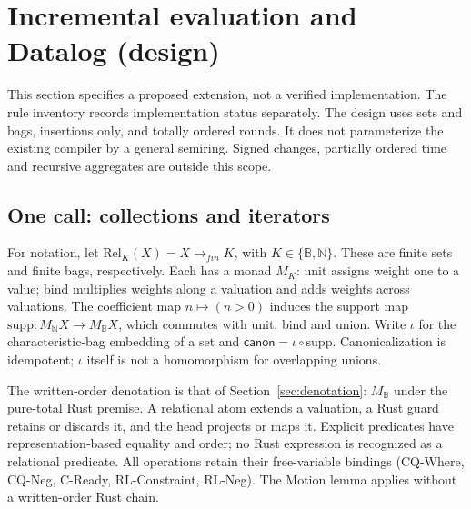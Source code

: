 \section{Incremental evaluation and Datalog (design)}
\label{sec:incremental}
This section specifies a proposed extension, not a verified implementation.
The rule inventory records implementation status separately. The design uses
sets and bags, insertions only, and totally ordered rounds. It does not
parameterize the existing compiler by a general semiring. Signed changes,
partially ordered time and recursive aggregates are outside this scope.

\subsection{One call: collections and iterators}
For notation, let $\mathrm{Rel}_K(X)=X\to_{fin}K$, with
$K\in\{\mathbb B,\mathbb N\}$. These are finite sets and finite bags,
respectively. Each has a monad $M_K$: unit assigns weight one to a value;
bind multiplies weights along a valuation and adds weights across valuations.
The coefficient map $n\mapsto(n>0)$ induces the support map
$\mathrm{supp}:M_{\mathbb N}X\to M_{\mathbb B}X$, which commutes with unit,
bind and union. Write $\iota$ for the characteristic-bag embedding of a set
and $\mathsf{canon}=\iota\circ\mathrm{supp}$. Canonicalization is idempotent;
$\iota$ itself is not a homomorphism for overlapping unions.

The written-order denotation is that of Section~\ref{sec:denotation}:
$M_{\mathbb B}$ under the pure-total Rust premise. A relational atom extends
a valuation, a Rust guard retains or discards it, and the head projects or
maps it. Explicit  predicates have representation-based equality
and order; no Rust expression is recognized as a relational predicate.
All operations retain their free-variable bindings (CQ-Where, CQ-Neg,
C-Ready, RL-Constraint, RL-Neg). The Motion lemma applies without a
written-order Rust chain.

